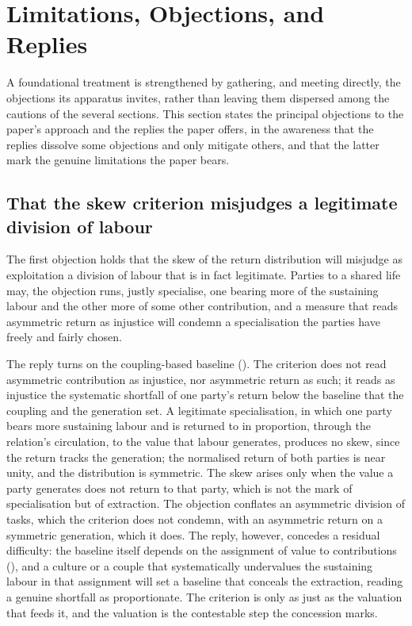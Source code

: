 \section{Limitations, Objections, and Replies}
\label{p11:sec:objections}

\noindent
A foundational treatment is strengthened by gathering, and meeting directly, the objections its apparatus invites, rather than leaving them dispersed among the cautions of the several sections. This section states the principal objections to the paper's approach and the replies the paper offers, in the awareness that the replies dissolve some objections and only mitigate others, and that the latter mark the genuine limitations the paper bears.

\subsection{That the skew criterion misjudges a legitimate division of labour}
\label{p11:sec:obj-division}

The first objection holds that the skew of the return distribution will misjudge as exploitation a division of labour that is in fact legitimate. Parties to a shared life may, the objection runs, justly specialise, one bearing more of the sustaining labour and the other more of some other contribution, and a measure that reads asymmetric return as injustice will condemn a specialisation the parties have freely and fairly chosen.

The reply turns on the coupling-based baseline (). The criterion does not read asymmetric contribution as injustice, nor asymmetric return as such; it reads as injustice the systematic shortfall of one party's return below the baseline that the coupling and the generation set. A legitimate specialisation, in which one party bears more sustaining labour and is returned to in proportion, through the relation's circulation, to the value that labour generates, produces no skew, since the return tracks the generation; the normalised return of both parties is near unity, and the distribution is symmetric. The skew arises only when the value a party generates does not return to that party, which is not the mark of specialisation but of extraction. The objection conflates an asymmetric division of tasks, which the criterion does not condemn, with an asymmetric return on a symmetric generation, which it does. The reply, however, concedes a residual difficulty: the baseline itself depends on the assignment of value to contributions (), and a culture or a couple that systematically undervalues the sustaining labour in that assignment will set a baseline that conceals the extraction, reading a genuine shortfall as proportionate. The criterion is only as just as the valuation that feeds it, and the valuation is the contestable step the concession marks.


